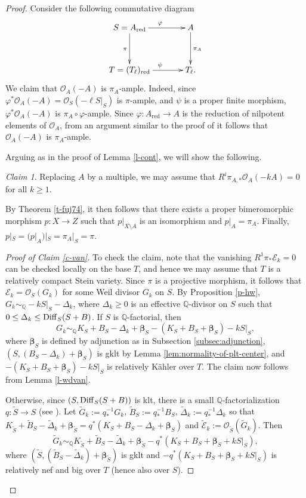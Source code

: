 \documentclass[12pt]{amsart}
\theoremstyle{plain}
\theoremstyle{remark}
\theoremstyle{definition}
\newcommand{\red}[0]{\operatorname{red}}
\newcommand{\<}{\leq}
\def\>{\geq}
\newcommand{\mbQ}{\mathbb{Q}}
\def\mcO{\mathcal{O}}
\newcommand{\OO}{{\mathcal{O}}}
\newcommand{\Q}{{\mathbb{Q}}}
\newcommand{\vphi}{\varphi}
\def\>{\geq}
\def\mcO{\mathcal{O}}
\def\bbeta{\boldsymbol{\beta}}
\theoremstyle{definition}
\theoremstyle{definition}
\numberwithin{equation}{section}
\theoremstyle{remark}
\newtheorem{claim}[theorem]{Claim}
\begin{document}
\begin{proof}
Consider the following commutative diagram 
\begin{equation}
    \xymatrixcolsep{3pc}\xymatrixrowsep{3pc}\xymatrix{
S=A_{\red}\ar[r]^{\vphi}\ar[d]_{\pi} & A\ar[d]^{\pi_A}\\
T=(T_\ell)_{\red}\ar[r]^{\psi} & T_\ell.
    }
\end{equation}
We claim that $\mcO_A(-A)$ is $\pi_A$-ample. Indeed, since $\vphi^*\mcO_A(-A)=\mcO_S(-\ell S|_S)$ is $\pi$-ample, and $\psi$ is a proper finite morphism, $\vphi^*\mcO_A(-A)$ is $\pi_A\circ\vphi$-ample. Since $\vphi:A_{\red}\to A$ is the reduction of nilpotent elements of $\mcO_A$, from an argument similar to the proof of \cite[Proposition 1.2.16(i)]{Laz04a} it follows that $\mcO_A(-A)$ is $\pi_A$-ample. 

Arguing as in the proof of Lemma \ref{l-cont}, we will show the following. 
\begin{claim}\label{c-van+}
    Replacing $A$ by a multiple, we may assume that $R^i\pi  _{A,*}\OO _{A}(-kA)=0$ for all $k\>1$.
\end{claim} 

By Theorem \ref{t-fuj74}, it then follows that there exists a proper bimeromorphic morphism $p:X\to Z$ such that $p|_{X\setminus A}$ is an isomorphism and $p|_{A}=\pi _A$.
Finally, $p|_S=(p|_A)|_S=\pi _A|_S=\pi$.


\begin{proof}[Proof of Claim \ref{c-van}]To check the claim, note that the vanishing $R^1\pi _* \mathcal E_k =0$ can be checked locally on the base $T$, and hence we may assume that $T$ is a relatively compact Stein variety. Since $\pi$ is a projective morphism,  it follows  that $\mathcal E_k=\OO _S(G_k)$ for some Weil divisor $G_k$ on $S$. 
By Proposition \ref{p-hw}, $G_k \sim _\Q -kS|_S-\Delta_k$, where $\Delta_k\>0$ is an effective $\mbQ$-divisor on $S$ such that $0\leq \Delta _k\leq {\rm Diff}_S(S+B)$.
If $S$ is $\Q$-factorial, then
\[ G_k\sim _\Q K_{ S}+B_S-\Delta _k+\bbeta _S-(K_S+B_S+\bbeta _S)-kS|_S,\]
where $\bbeta_S$ is defined by adjunction as in Subsection \ref{subsec:adjunction}, $(S, (B_S-\Delta _k)+\bbeta _S)$ is gklt by Lemma \ref{lem:normality-of-plt-center}, and $-(K_S+B_S+\bbeta _S)-kS|_S$ is relatively K\"ahler over $T$. The claim now follows from Lemma \ref{l-wdvan}.

Otherwise,  since $(S, {\rm Diff}_S(S+B))$ is  klt, there is  a small $\mbQ$-factorialization $q:\tilde S\to S$ (see \cite[Theorem 2.19]{DHY23}). Let $\tilde G_k:=q^{-1}_*G_k$, $\tilde B_S:=q^{-1}_*B_S $, $ \tilde \Delta _k:=q^{-1}_*\Delta _k$ so that $K_{\tilde S}+\tilde B_S-\tilde \Delta _k+\bbeta _{\tilde S} =q^*(K_S+B_S-\Delta _k+\bbeta _S)$
and $\tilde{\mathcal E} _k :=\OO _{\tilde S}(\tilde G_k)$. Then
\[\tilde G_k\sim _\Q K_{\tilde S}+\tilde B_S-\tilde \Delta _k+\bbeta _{\tilde S}-q^*(K_S+B_S+\bbeta _S+kS|_S),\] where 
$(\tilde  S, (\tilde B_S-\tilde \Delta _k)+\bbeta _{\tilde S})$ is  gklt and $-q^*(K_S+B_S+\bbeta _S+kS|_S)$ is relatively nef and big over $T$ (hence also over $S$).


\end{proof}
\end{proof}
\end{document}
